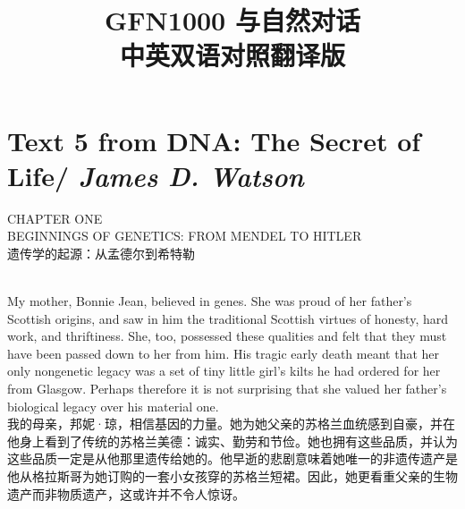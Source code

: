\documentclass{article}
\begin{document}
\title{\textbf{
GFN1000 与自然对话\\
中英双语对照翻译版
}} %
\date{}
\maketitle %

\setcounter{secnumdepth}{0} %
\tableofcontents
\newpage
\section{Text 5 from DNA: The Secret of Life/ \textit{James D. Watson}}
\begin{center}
    CHAPTER ONE\\
    BEGINNINGS OF GENETICS: FROM MENDEL TO HITLER\\
    遗传学的起源：从孟德尔到希特勒\\
\end{center}

\\
My mother, Bonnie Jean, believed in genes. She was proud of her father’s Scottish origins, and saw in him the traditional Scottish virtues of honesty, hard work, and thriftiness. She, too, possessed these qualities and felt that they must have been passed down to her from him. His tragic early death meant that her only nongenetic legacy was a set of tiny little girl’s kilts he had ordered for her from Glasgow. Perhaps therefore it is not surprising that she valued her father’s biological legacy over his material one.\\
我的母亲，邦妮·琼，相信基因的力量。她为她父亲的苏格兰血统感到自豪，并在他身上看到了传统的苏格兰美德：诚实、勤劳和节俭。她也拥有这些品质，并认为这些品质一定是从他那里遗传给她的。他早逝的悲剧意味着她唯一的非遗传遗产是他从格拉斯哥为她订购的一套小女孩穿的苏格兰短裙。因此，她更看重父亲的生物遗产而非物质遗产，这或许并不令人惊讶。\\
\end{document}
